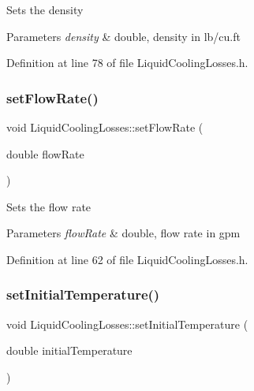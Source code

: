 Sets the density 
\begin{DoxyParams}{Parameters}
{\em density} & double, density in lb/cu.\+ft \\
\hline
\end{DoxyParams}


Definition at line 78 of file Liquid\+Cooling\+Losses.\+h.

\mbox{\label{class_liquid_cooling_losses_a7739742c5f21919a62c304b7c525b1b6}} 
\subsubsection{\texorpdfstring{set\+Flow\+Rate()}{setFlowRate()}}
{\footnotesize\ttfamily void Liquid\+Cooling\+Losses\+::set\+Flow\+Rate (\begin{DoxyParamCaption}\item[{double}]{flow\+Rate }\end{DoxyParamCaption})\hspace{0.3cm}{\ttfamily [inline]}}

Sets the flow rate 
\begin{DoxyParams}{Parameters}
{\em flow\+Rate} & double, flow rate in gpm \\
\hline
\end{DoxyParams}


Definition at line 62 of file Liquid\+Cooling\+Losses.\+h.

\mbox{\label{class_liquid_cooling_losses_aa7f7718de77a96b8e269a06a24d297d8}} 
\subsubsection{\texorpdfstring{set\+Initial\+Temperature()}{setInitialTemperature()}}
{\footnotesize\ttfamily void Liquid\+Cooling\+Losses\+::set\+Initial\+Temperature (\begin{DoxyParamCaption}\item[{double}]{initial\+Temperature }\end{DoxyParamCaption})\hspace{0.3cm}{\ttfamily [inline]}}


